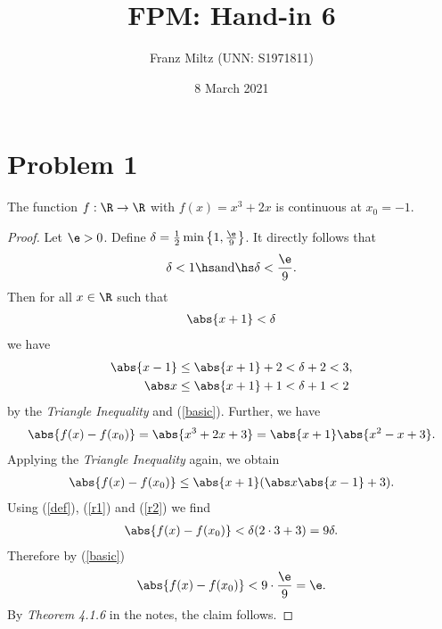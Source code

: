 \documentclass{article}
\begin{document}
\title{FPM: Hand-in 6}
\author{Franz Miltz (UNN: S1971811)}
\date{8 March 2021}
\maketitle
\mkthms

\section*{Problem 1}

\begin{claim*}
    The function $f:\R\to\R$ with $f(x) = x^3+2x$ is continuous at $x_0=-1$.
\end{claim*}
\begin{proof}
    Let $\e>0$. Define $\delta = \frac{1}{2}\min\left\lbrace1,\frac{\e}{9}\right\rbrace$. It directly follows that
    \begin{align}
        \label{basic}
        \delta< 1\hs\text{and}\hs \delta <\frac{\e}{9}.
    \end{align}
    Then for all $x\in\R$ such that
    \begin{align}
        \label{def}
        \abs{x+1}<\delta
    \end{align}
    we have
    \begin{align}
        \label{r1}
        \abs{x-1}&\leq \abs{x+1} + 2 < \delta + 2 < 3,\\
        \label{r2}
        \abs x   &\leq \abs{x+1}+1 < \delta + 1 < 2
    \end{align}
    by the \emph{Triangle Inequality} and (\ref{basic}). Further, we have
    \begin{align*}
        \abs{f(x)-f(x_0)}=\abs{x^3+2x+3}=\abs{x+1}\abs{x^2-x+3}.
    \end{align*}
    Applying the \emph{Triangle Inequality} again, we obtain
    \begin{align*}
        \abs{f(x)-f(x_0)}\leq \abs{x+1}(\abs x\abs{x-1}+3).
    \end{align*}
    Using (\ref{def}), (\ref{r1}) and (\ref{r2}) we find 
    \begin{align*}
        \abs{f(x)-f(x_0)} < \delta (2\cdot 3 + 3) = 9\delta.
    \end{align*}
    Therefore by (\ref{basic})
    \begin{align*}
        \abs{f(x)-f(x_0)} < 9\cdot\frac{\e}{9}=\e.
    \end{align*}
    By \emph{Theorem 4.1.6} in the notes, the claim follows.
\end{proof}
\end{document}
